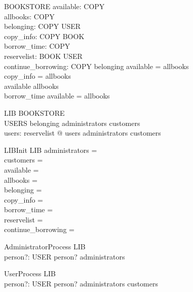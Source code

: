 \begin{schema}{BOOKSTORE}
  available: \power  COPY\\
  allbooks: \power  COPY\\
  belonging: COPY \pfun  USER\\
  copy\_info: COPY \pfun  BOOK\\
  borrow\_time: COPY \pfun  \nat \\
  reservelist: BOOK \pfun  \seq  USER\\
  continue\_borrowing: \power  COPY
\where
  \dom  belonging \cup  available = allbooks\\
  \dom  copy\_info = allbooks\\
  available \subseteq  allbooks\\
  \dom  borrow\_time \cup  available = allbooks
\end{schema}

\begin{schema}{LIB}
  BOOKSTORE\\
  USERS
\where
  \ran  belonging \subseteq  administrators \cup  customers\\
  \forall  users: \ran  reservelist @ \ran  users \subseteq  administrators \cup  customers
\end{schema}

\begin{schema}{LIBInit}
  LIB
\where
  administrators = \emptyset\\
  customers = \emptyset\\
  available = \emptyset\\
  allbooks = \emptyset\\
  belonging = \emptyset\\
  copy\_info = \emptyset\\
  borrow\_time = \emptyset\\
  reservelist = \emptyset\\
  continue\_borrowing = \emptyset
\end{schema}

\begin{schema}{AdministratorProcess}
  \Delta LIB\\
  person?: USER
\where
  person? \in  administrators
\end{schema}

\begin{schema}{UserProcess}
  \Delta LIB\\
  person?: USER
\where
  person? \in  administrators \cup  customers
\end{schema}

